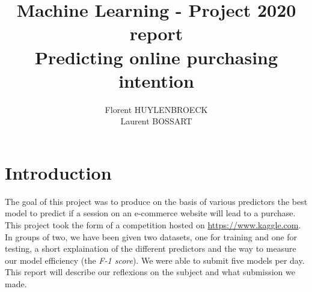 \documentclass[11pt]{article}
\title{Machine Learning - Project 2020 report\\
\small Predicting online purchasing intention}
\author{Florent HUYLENBROECK\\
Laurent BOSSART}
\begin{document}
\maketitle
\newpage
\section*{Introduction}
The goal of this project was to produce on the basis of various predictors the best model to predict if a session on an e-commerce website will lead to a purchase.
This project took the form of a competition hosted on \url{ https://www.kaggle.com}. \\
In groups of two, we have been given two datasets, one for training and one for testing, a short explaination of the different predictors and the way to measure our model efficiency (the \emph{F-1 score}). We were able to submit five models per day.\\
This report will describe our reflexions on the subject and what submission we made.
\end{document}
